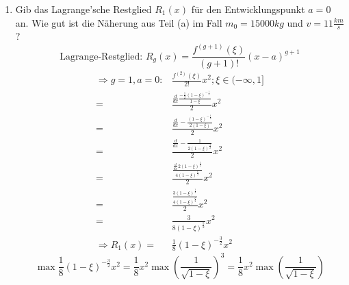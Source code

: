\documentclass{HM}
\begin{document}
\begin{enumerate}
\begin{enumerate}
		 	\item Gib das Lagrange'sche Restglied $R_1(x)$ für den Entwicklungspunkt $a=0$ an. Wie gut ist die Näherung aus Teil (a) im Fall $m_0=15000kg$ und $v=11\frac{km}{s}$?
		 	$$\text{Lagrange-Restglied: }R_g(x)=\frac{f^{(g+1)}(\xi)}{(g+1)!}(x-a)^{g+1}$$
		 	\begin{align*}
		 		\Rightarrow g=1, a=0:
		 		&\frac{f^{(2)}(\xi)}{2!}x^2; \xi\in(-\infty,1]\\
		 		=&\frac{\frac{d}{dx}\frac{-\frac{1}{2}(1-\xi)^{-\frac{1}{2}}}{1-\xi}}{2}x^2\\
		 		=&\frac{\frac{d}{dx}-\frac{(1-\xi)^{-\frac{1}{2}}}{2(1-\xi)}}{2}x^2\\
		 		=&\frac{\frac{d}{dx}-\frac{1}{2(1-\xi)^{\frac{3}{2}}}}{2}x^2\\
		 		=&\frac{\frac{\frac{d}{dx}2(1-\xi)^{\frac{3}{2}}}{4(1-\xi)^{\frac{6}{2}}}}{2}x^2\\
		 		=&\frac{\frac{3(1-\xi)^{\frac{1}{2}}}{4(1-\xi)^{\frac{6}{2}}}}{2}x^2\\
		 		=&\frac{3}{8(1-\xi)^{\frac{5}{2}}}x^2\\
		 		\Rightarrow R_1(x)=&\frac{1}{8}(1-\xi)^{-\frac{3}{2}}x^2
		 	\end{align*}
		 	$$\max \frac{1}{8}(1-\xi)^{-\frac{3}{2}}x^2
		 	=\frac{1}{8}x^2\max\left(\frac{1}{\sqrt{1-\xi}}\right)^3
		 	=\frac{1}{8}x^2\max\left(\frac{1}{\sqrt{1-\xi}}\right)$$
		 \end{enumerate}
	\end{enumerate}
\end{document}
